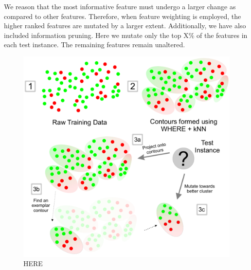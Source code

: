 \documentclass[conference]{IEEEtran}
\begin{document}
We reason that the most informative feature must undergo a larger change as compared to other features. Therefore, when feature weighting is employed, the higher ranked features are mutated by a larger extent. Additionally, we have also included information pruning. Here we mutate only the top X\% of the features in each test instance. The remaining features remain unaltered. 

\begin{figure}
\centering
\includegraphics[width=\linewidth]{_figs/WHAT-Clusters2.pdf}
\caption{HERE}
\label{fig:whatflow}
\end{figure}
\end{document}
